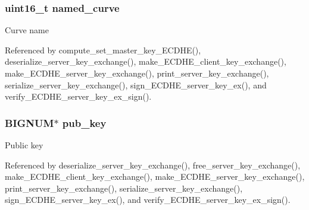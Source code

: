 \subsubsection[{\texorpdfstring{named\+\_\+curve}{named_curve}}]{\setlength{\rightskip}{0pt plus 5cm}uint16\+\_\+t named\+\_\+curve}\hypertarget{structecdhe__server__key__exchange__t_a5754cc60d6f7a74a313db0e4bc607b07}{}\label{structecdhe__server__key__exchange__t_a5754cc60d6f7a74a313db0e4bc607b07}
Curve name 

Referenced by compute\+\_\+set\+\_\+master\+\_\+key\+\_\+\+E\+C\+D\+H\+E(), deserialize\+\_\+server\+\_\+key\+\_\+exchange(), make\+\_\+\+E\+C\+D\+H\+E\+\_\+client\+\_\+key\+\_\+exchange(), make\+\_\+\+E\+C\+D\+H\+E\+\_\+server\+\_\+key\+\_\+exchange(), print\+\_\+server\+\_\+key\+\_\+exchange(), serialize\+\_\+server\+\_\+key\+\_\+exchange(), sign\+\_\+\+E\+C\+D\+H\+E\+\_\+server\+\_\+key\+\_\+ex(), and verify\+\_\+\+E\+C\+D\+H\+E\+\_\+server\+\_\+key\+\_\+ex\+\_\+sign().

\subsubsection[{\texorpdfstring{pub\+\_\+key}{pub_key}}]{\setlength{\rightskip}{0pt plus 5cm}B\+I\+G\+N\+UM$\ast$ pub\+\_\+key}\hypertarget{structecdhe__server__key__exchange__t_aad713005343ebfb84e09a7441d655802}{}\label{structecdhe__server__key__exchange__t_aad713005343ebfb84e09a7441d655802}
Public key 

Referenced by deserialize\+\_\+server\+\_\+key\+\_\+exchange(), free\+\_\+server\+\_\+key\+\_\+exchange(), make\+\_\+\+E\+C\+D\+H\+E\+\_\+client\+\_\+key\+\_\+exchange(), make\+\_\+\+E\+C\+D\+H\+E\+\_\+server\+\_\+key\+\_\+exchange(), print\+\_\+server\+\_\+key\+\_\+exchange(), serialize\+\_\+server\+\_\+key\+\_\+exchange(), sign\+\_\+\+E\+C\+D\+H\+E\+\_\+server\+\_\+key\+\_\+ex(), and verify\+\_\+\+E\+C\+D\+H\+E\+\_\+server\+\_\+key\+\_\+ex\+\_\+sign().

